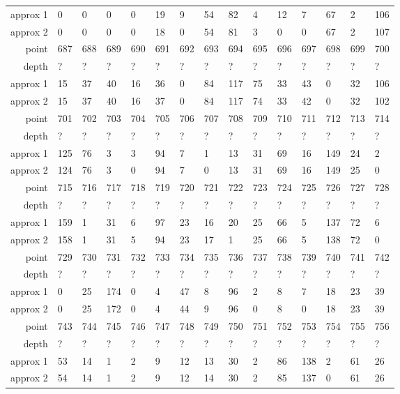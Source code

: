 \begin{center}
\begin{supertabular}{|r|l l l l l l l l l l l l l l|}
approx 1 & 0 & 0 & 0 & 0 & 19 & 9 & 54 & 82 & 4 & 12 & 7 & 67 & 2 & 106 \\
approx 2 & 0 & 0 & 0 & 0 & 18 & 0 & 54 & 81 & 3 & 0 & 0 & 67 & 2 & 107 \\
\hline
point & 687 & 688 & 689 & 690 & 691 & 692 & 693 & 694 & 695 & 696 & 697 & 698 & 699 & 700 \\
\hline
depth & ? & ? & ? & ? & ? & ? & ? & ? & ? & ? & ? & ? & ? & ? \\
approx 1 & 15 & 37 & 40 & 16 & 36 & 0 & 84 & 117 & 75 & 33 & 43 & 0 & 32 & 106 \\
approx 2 & 15 & 37 & 40 & 16 & 37 & 0 & 84 & 117 & 74 & 33 & 42 & 0 & 32 & 102 \\
\hline
point & 701 & 702 & 703 & 704 & 705 & 706 & 707 & 708 & 709 & 710 & 711 & 712 & 713 & 714 \\
\hline
depth & ? & ? & ? & ? & ? & ? & ? & ? & ? & ? & ? & ? & ? & ? \\
approx 1 & 125 & 76 & 3 & 3 & 94 & 7 & 1 & 13 & 31 & 69 & 16 & 149 & 24 & 2 \\
approx 2 & 124 & 76 & 3 & 0 & 94 & 7 & 0 & 13 & 31 & 69 & 16 & 149 & 25 & 0 \\
\hline
point & 715 & 716 & 717 & 718 & 719 & 720 & 721 & 722 & 723 & 724 & 725 & 726 & 727 & 728 \\
\hline
depth & ? & ? & ? & ? & ? & ? & ? & ? & ? & ? & ? & ? & ? & ? \\
approx 1 & 159 & 1 & 31 & 6 & 97 & 23 & 16 & 20 & 25 & 66 & 5 & 137 & 72 & 6 \\
approx 2 & 158 & 1 & 31 & 5 & 94 & 23 & 17 & 1 & 25 & 66 & 5 & 138 & 72 & 0 \\
\hline
point & 729 & 730 & 731 & 732 & 733 & 734 & 735 & 736 & 737 & 738 & 739 & 740 & 741 & 742 \\
\hline
depth & ? & ? & ? & ? & ? & ? & ? & ? & ? & ? & ? & ? & ? & ? \\
approx 1 & 0 & 25 & 174 & 0 & 4 & 47 & 8 & 96 & 2 & 8 & 7 & 18 & 23 & 39 \\
approx 2 & 0 & 25 & 172 & 0 & 4 & 44 & 9 & 96 & 0 & 8 & 0 & 18 & 23 & 39 \\
\hline
point & 743 & 744 & 745 & 746 & 747 & 748 & 749 & 750 & 751 & 752 & 753 & 754 & 755 & 756 \\
\hline
depth & ? & ? & ? & ? & ? & ? & ? & ? & ? & ? & ? & ? & ? & ? \\
approx 1 & 53 & 14 & 1 & 2 & 9 & 12 & 13 & 30 & 2 & 86 & 138 & 2 & 61 & 26 \\
approx 2 & 54 & 14 & 1 & 2 & 9 & 12 & 14 & 30 & 2 & 85 & 137 & 0 & 61 & 26 \\

\end{supertabular}
\end{center}
